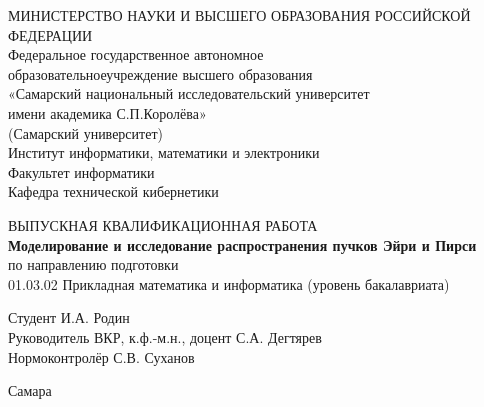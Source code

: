     \begin{titlepage}

        \center


        {МИНИСТЕРСТВО НАУКИ И ВЫСШЕГО ОБРАЗОВАНИЯ РОССИЙСКОЙ ФЕДЕРАЦИИ\\
        {Федеральное государственное автономное  \\[-0.2cm]
        образовательноеучреждение высшего образования\\[-0.2cm]
        «Самарский национальный исследовательский университет \\[-0.2cm]
        имени академика С.П.Королёва»\\[-0.2cm]
        (Самарский университет)}\\[0.7cm]
        {Институт информатики, математики и электроники}\\[-0.2cm]
        {Факультет информатики}\\[-0.2cm]
        {Кафедра технической кибернетики}\\[2cm]
        }


        \vfill\vfill


        \vfill

        \begin{center}
            ВЫПУСКНАЯ КВАЛИФИКАЦИОННАЯ РАБОТА \\[1cm]
            \textbf{\large Моделирование и исследование распространения пучков Эйри и Пирси} \\[1cm]
            по направлению подготовки\\[-0.2cm]
            01.03.02 Прикладная математика и информатика (уровень бакалавриата)\\[2cm]
        \end{center}

        \begin{minipage}{0.8\textwidth}
            Студент    \hfill    И.А. Родин \\
            Руководитель ВКР, к.ф.-м.н., доцент \hfill  С.А. Дегтярев\\
            Нормоконтролёр        \hfill С.В. Суханов\\
        \end{minipage}

        \vfill\vfill\vfill

        {\centering Самара \the\year}


    \end{titlepage}

